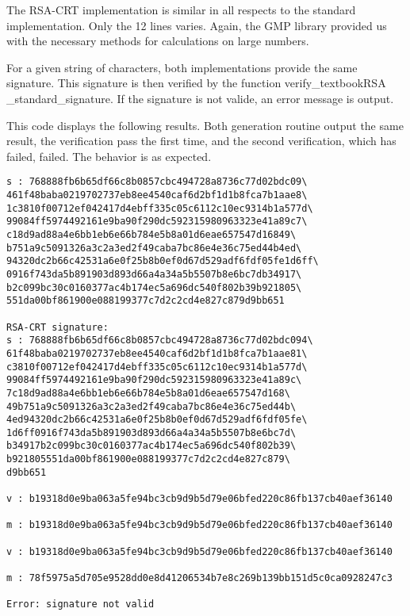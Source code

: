\documentclass[a4paper]{report}
\begin{document}
The RSA-CRT implementation is similar in all respects to the standard implementation. Only the 12 lines varies. Again, the GMP library provided us with the necessary methods for calculations on large numbers.


For a given string of characters, both implementations provide the same signature. This signature is then verified by the function verify\_textbookRSA\\\_standard\_signature. If the signature is not valide, an error message is output.


This code displays the following results. Both generation routine output the same result, the verification pass the first time, and the second verification, which has failed, failed. The behavior is as expected.

\begin{verbatim}
s : 768888fb6b65df66c8b0857cbc494728a8736c77d02bdc09\
461f48baba0219702737eb8ee4540caf6d2bf1d1b8fca7b1aae8\
1c3810f00712ef042417d4ebff335c05c6112c10ec9314b1a577d\
99084ff5974492161e9ba90f290dc592315980963323e41a89c7\
c18d9ad88a4e6bb1eb6e66b784e5b8a01d6eae657547d16849\
b751a9c5091326a3c2a3ed2f49caba7bc86e4e36c75ed44b4ed\
94320dc2b66c42531a6e0f25b8b0ef0d67d529adf6fdf05fe1d6ff\
0916f743da5b891903d893d66a4a34a5b5507b8e6bc7db34917\
b2c099bc30c0160377ac4b174ec5a696dc540f802b39b921805\
551da00bf861900e088199377c7d2c2cd4e827c879d9bb651

RSA-CRT signature:
s : 768888fb6b65df66c8b0857cbc494728a8736c77d02bdc094\
61f48baba0219702737eb8ee4540caf6d2bf1d1b8fca7b1aae81\
c3810f00712ef042417d4ebff335c05c6112c10ec9314b1a577d\
99084ff5974492161e9ba90f290dc592315980963323e41a89c\
7c18d9ad88a4e6bb1eb6e66b784e5b8a01d6eae657547d168\
49b751a9c5091326a3c2a3ed2f49caba7bc86e4e36c75ed44b\
4ed94320dc2b66c42531a6e0f25b8b0ef0d67d529adf6fdf05fe\
1d6ff0916f743da5b891903d893d66a4a34a5b5507b8e6bc7d\
b34917b2c099bc30c0160377ac4b174ec5a696dc540f802b39\
b921805551da00bf861900e088199377c7d2c2cd4e827c879\
d9bb651

v : b19318d0e9ba063a5fe94bc3cb9d9b5d79e06bfed220c86fb137cb40aef36140

m : b19318d0e9ba063a5fe94bc3cb9d9b5d79e06bfed220c86fb137cb40aef36140

v : b19318d0e9ba063a5fe94bc3cb9d9b5d79e06bfed220c86fb137cb40aef36140

m : 78f5975a5d705e9528dd0e8d41206534b7e8c269b139bb151d5c0ca0928247c3

Error: signature not valid
\end{verbatim}
\end{document}
